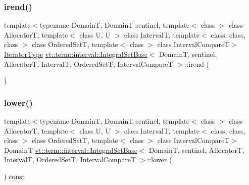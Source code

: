 \mbox{\label{structvt_1_1term_1_1interval_1_1_integral_set_base_a2656b9c3920215f4cbc3a8bad3f3b9fd}} 
\subsubsection{\texorpdfstring{irend()}{irend()}}
{\footnotesize\ttfamily template$<$typename DomainT, DomainT sentinel, template$<$ class $>$ class AllocatorT, template$<$ class U, U $>$ class IntervalT, template$<$ class, class, class $>$ class Ordered\+SetT, template$<$ class $>$ class Interval\+CompareT$>$ \\
\hyperlink{structvt_1_1term_1_1interval_1_1_integral_set_base_a111b2ec1ea960a40ba4270be702f11f1}{Iterator\+Type} \hyperlink{structvt_1_1term_1_1interval_1_1_integral_set_base}{vt\+::term\+::interval\+::\+Integral\+Set\+Base}$<$ DomainT, sentinel, AllocatorT, IntervalT, Ordered\+SetT, Interval\+CompareT $>$\+::irend (\begin{DoxyParamCaption}{ }\end{DoxyParamCaption})\hspace{0.3cm}{\ttfamily [inline]}}

\mbox{\label{structvt_1_1term_1_1interval_1_1_integral_set_base_a5d0984e302e0ddb9828130261b86ec50}} 
\subsubsection{\texorpdfstring{lower()}{lower()}}
{\footnotesize\ttfamily template$<$typename DomainT, DomainT sentinel, template$<$ class $>$ class AllocatorT, template$<$ class U, U $>$ class IntervalT, template$<$ class, class, class $>$ class Ordered\+SetT, template$<$ class $>$ class Interval\+CompareT$>$ \\
DomainT \hyperlink{structvt_1_1term_1_1interval_1_1_integral_set_base}{vt\+::term\+::interval\+::\+Integral\+Set\+Base}$<$ DomainT, sentinel, AllocatorT, IntervalT, Ordered\+SetT, Interval\+CompareT $>$\+::lower (\begin{DoxyParamCaption}{ }\end{DoxyParamCaption}) const\hspace{0.3cm}{\ttfamily [inline]}}

